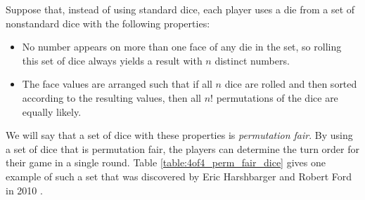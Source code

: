 \documentclass{article}
\theoremstyle{plain}
\theoremstyle{definition}
\begin{document}
Suppose that, instead of using standard dice, each player uses a die from a set of nonstandard dice with the following properties:
\begin{itemize}
    \item No number appears on more than one face of any die in the set, so rolling this set of dice always yields a result with $n$ distinct numbers. 
    \item The face values are arranged such that if all $n$ dice are rolled and then sorted according to the resulting values, then all $n!$ permutations of the dice are equally likely.
\end{itemize}
We will say that a set of dice with these properties is \emph{permutation fair}. By using a set of dice that is permutation fair, the players can determine the turn order for their game in a single round. Table \ref{table:4of4_perm_fair_dice} gives one example of such a set that was discovered by Eric Harshbarger and Robert Ford in 2010 \cite{harshbarger2010}.


\end{document}
